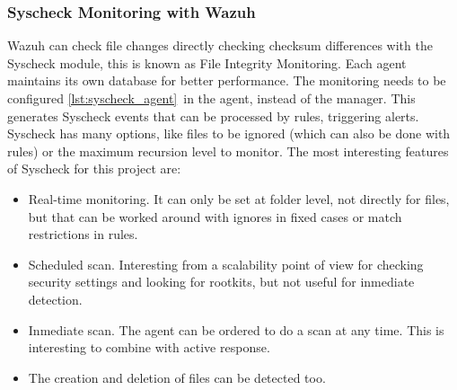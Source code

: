 \subsubsection{Syscheck Monitoring with Wazuh}
Wazuh can check file changes directly checking checksum differences with the Syscheck module, this is known as File Integrity Monitoring.
Each agent maintains its own database for better performance.
\linej
The monitoring needs to be configured \ref{lst:syscheck_agent}\ in the agent, instead of the manager.
This generates Syscheck events that can be processed by rules, triggering alerts.
Syscheck has many options, like files to be ignored (which can also be done with rules) or the maximum recursion level to monitor.
\linej
The most interesting features of Syscheck for this project are\cite{libro_ossec}:
\begin{itemize}
	\item Real-time monitoring. It can only be set at folder level, not directly for files, but that can be worked around with ignores in fixed cases or match restrictions in rules.
	\item Scheduled scan. Interesting from a scalability point of view for checking security settings and looking for rootkits, but not useful for inmediate detection.
	\item Inmediate scan. The agent can be ordered to do a scan at any time. This is interesting to combine with active response.
	\item The creation and deletion of files can be detected too.
\end{itemize}

